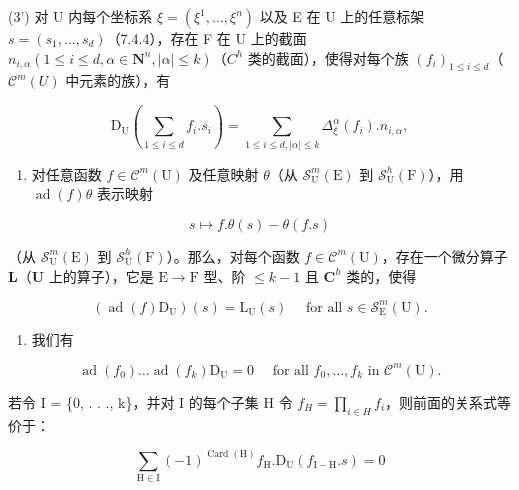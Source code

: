 (3') 对 U 内每个坐标系 \(\xi = (\xi^1, \ldots, \xi^n)\) 以及 E 在 U 上的任意标架 \(s = (s_1, \ldots, s_d)\)（7.4.4），存在 F 在 U 上的截面 \(n_{i,\alpha}(1 \leqslant i \leqslant d, \alpha \in \mathbf{N}^n, |\alpha| \leqslant k)\)（\(C^h\) 类的截面），使得对每个族 \((f_i)_{1 \leqslant i \leqslant d}\)（\(\mathcal{C}^m(U)\) 中元素的族），有

\[
\mathrm{D} _ {\mathrm{U}} \left(\sum_ {1 \leqslant i \leqslant d} f _ {i}. s _ {i}\right) = \sum_ {1 \leqslant i \leqslant d, | \alpha | \leqslant k} \Delta_ {\xi} ^ {\alpha} (f _ {i}). n _ {i, \alpha},
\]

\begin{enumerate}
\def\labelenumi{(\arabic{enumi})}
\setcounter{enumi}{3}
\tightlist
\item
  对任意函数 \(f \in \mathcal{C}^m(\mathrm{U})\) 及任意映射 \(\theta\)（从 \(\mathcal{S}_{\mathrm{U}}^{m}(\mathrm{E})\) 到 \(\mathcal{S}_{\mathrm{U}}^{h}(\mathrm{F})\)），用 \(\operatorname{ad}(f)\theta\) 表示映射
\end{enumerate}

\[
s \mapsto f. \theta (s) - \theta (f. s)
\]

（从 \(\mathcal{S}_{\mathrm{U}}^{m}(\mathrm{E})\) 到 \(\mathcal{S}_{\mathrm{U}}^{h}(\mathrm{F})\)）。那么，对每个函数 \(f \in \mathcal{C}^{m}(\mathrm{U})\)，存在一个微分算子 \(\mathbf{L}\)（\(\mathbf{U}\) 上的算子），它是 \(\mathrm{E} \to \mathrm{F}\) 型、阶 \(\leqslant k - 1\) 且 \(\mathbf{C}^{h}\) 类的，使得

\[
(\operatorname{ad} (f) \mathrm{D} _ {\mathrm{U}}) (s) = \mathrm{L} _{\mathrm{U}}(s) \quad \text { for all } s \in \mathscr{S}_{\mathrm{E}}^{m}(\mathrm{U}).
\]

\begin{enumerate}
\def\labelenumi{(\arabic{enumi})}
\setcounter{enumi}{4}
\tightlist
\item
  我们有
\end{enumerate}

\[
\operatorname{ad} (f _ {0}) \dots \operatorname{ad} (f _ {k}) \mathrm{D} _ {\mathrm{U}} = 0 \quad \text { for all } f _ {0}, \dots , f _ {k} \text { in } \mathscr {C} ^ {m} (\mathrm{U}).
\]

若令 I = \{0, . . ., k\}，并对 I 的每个子集 H 令 \(f_{H} = \prod_{i \in H} f_i\)，则前面的关系式等价于：

\[
\sum_ {\mathrm{H} \in \mathrm{I}} (- 1) ^ {\operatorname{Card} (\mathrm{H})} f _ {\mathrm{H}}. \mathrm{D} _ {\mathrm{U}} (f _ {\mathrm{I-H}}. s) = 0
\]

